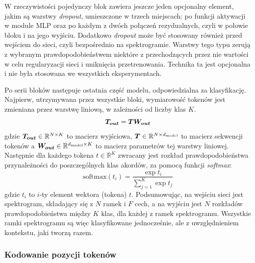 W rzeczywistości pojedynczy blok zawiera jeszcze jeden opcjonalny element, jakim są warstwy
\emph{dropout}, umieszczone w trzech miejscach: po funkcji aktywacji w module MLP oraz po każdym z
dwóch połączeń rezydualnych, czyli w połowie bloku i na jego wyjściu. Dodatkowo \emph{dropout} może
być stosowany również przed wejściem do sieci, czyli bezpośrednio na spektrogramie. Warstwy tego
typu zerują z wybranym prawdopodobieństwem niektóre z przechodzących przez nie wartości w celu
regularyzacji sieci i uniknięcia przetrenowania. Technika ta jest opcjonalna i nie była stosowana we
wszystkich eksperymentach.

Po serii bloków następuje ostatnia część modelu, odpowiedzialna za klasyfikację. Najpierw,
utrzymywana przez wszystkie bloki, wymiarowość tokenów jest zmieniana przez warstwę liniową, w
zależności od liczby klas $K$.
\begin{equation}
    \boldsymbol{T_{out}} = \boldsymbol{T} \boldsymbol{W_{out}}
\end{equation}
gdzie $\boldsymbol{T_{out}} \in \mathbb{R}^{N \times K}$ to macierz wyjściowa, $\boldsymbol{T} \in \mathbb{R}^{N \times d_{\mathrm{model}}}$ to
macierz sekwencji tokenów a $\boldsymbol{W_{out}} \in \mathbb{R}^{d_{\mathrm{model}} \times K}$ to macierz parametrów tej
warstwy liniowej. Następnie dla każdego tokena $t \in \mathbb{R}^K$ zwracany jest rozkład
prawdopodobieństwa przynależności do poszczególnych klas akordów, za pomocą funkcji \emph{softmax}:
\begin{equation}
    \textrm{softmax}(t_i) = \frac{\exp{t_i}}{\sum_{j=1}^{K}\exp{t_j}}
\end{equation}
gdzie $t_i$ to $i$-ty element wektora (tokena) $t$. Podsumowując, na wejściu sieci jest spektrogram,
składający się z $N$ ramek i $F$ cech, a na wyjściu jest $N$ rozkładów prawdopodobieństwa między $K$
klas, dla każdej z ramek spektrogramu. Wszystkie ramki spektrogramu są więc klasyfikowane
jednocześnie, ale z uwzględnieniem kontekstu, jaki tworzą razem.

\subsubsection{Kodowanie pozycji tokenów}

